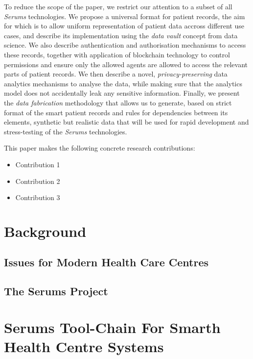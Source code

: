To reduce the scope of the paper, we restrict our attention to a subset of all \emph{Serums} technologies. We propose a universal format for patient records, the aim for which is to allow uniform representation of patient data accross different use cases, and describe its implementation using the \emph{data vault} concept from data science. We also describe authentication and authorisation mechanisms to access these records, together with application of blockchain technology to control permissions and ensure only the allowed agents are allowed to access the relevant parts of patient records. We then describe a novel, \emph{privacy-preserving} data analytics mechanisms to analyse the data, while making sure that the analytics model does not accidentally leak any sensitive information. Finally, we present the \emph{data fabrication} methodology that allows us to generate, based on strict format of the smart patient records and rules for dependencies between its elements, synthetic but realistic data that will be used for rapid development and stress-testing of the \emph{Serums} technologies.


This paper makes the following concrete research contributions:
\begin{itemize}
\item Contribution 1
\item Contribution 2
\item Contribution 3
\end{itemize}

\section{Background}

\subsection{Issues for Modern Health Care Centres}

\subsection{The Serums Project}


\section{Serums Tool-Chain For Smarth Health Centre Systems}

